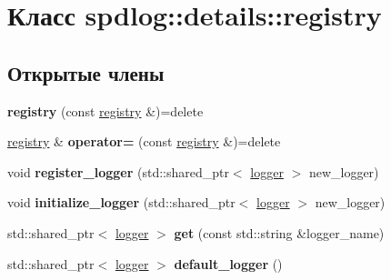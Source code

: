 \hypertarget{classspdlog_1_1details_1_1registry}{}\section{Класс spdlog\+:\+:details\+:\+:registry}
\label{classspdlog_1_1details_1_1registry}
\subsection*{Открытые члены}
\begin{DoxyCompactItemize}
\item 
\mbox{\label{classspdlog_1_1details_1_1registry_ab5c1a2f7b8e2e9eec4e0fa75d9167f3b}} 
{\bfseries registry} (const \hyperlink{classspdlog_1_1details_1_1registry}{registry} \&)=delete
\item 
\mbox{\label{classspdlog_1_1details_1_1registry_a12da238b4eda17829b194b36f383e8a0}} 
\hyperlink{classspdlog_1_1details_1_1registry}{registry} \& {\bfseries operator=} (const \hyperlink{classspdlog_1_1details_1_1registry}{registry} \&)=delete
\item 
\mbox{\label{classspdlog_1_1details_1_1registry_aab1ac59e4ee50c173b3ff1c32ca05ab5}} 
void {\bfseries register\+\_\+logger} (std\+::shared\+\_\+ptr$<$ \hyperlink{classspdlog_1_1logger}{logger} $>$ new\+\_\+logger)
\item 
\mbox{\label{classspdlog_1_1details_1_1registry_aff3103acaeb3d59e449e9ddc630c9e92}} 
void {\bfseries initialize\+\_\+logger} (std\+::shared\+\_\+ptr$<$ \hyperlink{classspdlog_1_1logger}{logger} $>$ new\+\_\+logger)
\item 
\mbox{\label{classspdlog_1_1details_1_1registry_ae803a4b6f743a2e4289cf9aa74f97527}} 
std\+::shared\+\_\+ptr$<$ \hyperlink{classspdlog_1_1logger}{logger} $>$ {\bfseries get} (const std\+::string \&logger\+\_\+name)
\item 
\mbox{\label{classspdlog_1_1details_1_1registry_a0325433c66d277bb107cf94787ddfcf0}} 
std\+::shared\+\_\+ptr$<$ \hyperlink{classspdlog_1_1logger}{logger} $>$ {\bfseries default\+\_\+logger} ()

\end{DoxyCompactItemize}
